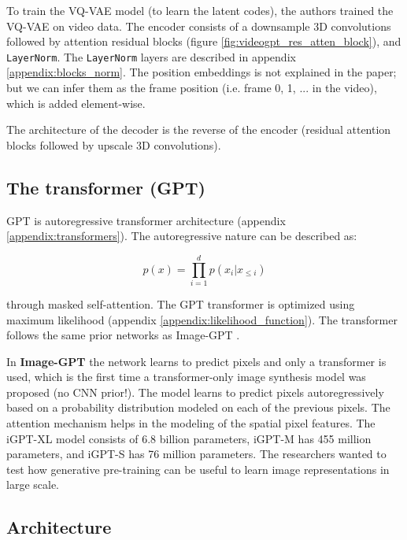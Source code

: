 To train the VQ-VAE model (to learn the latent codes), the authors trained the VQ-VAE on video data. The encoder consists of a downsample 3D convolutions followed by attention residual blocks (figure \ref{fig:videogpt_res_atten_block}), and \texttt{LayerNorm}. The \texttt{LayerNorm} layers are described in appendix \ref{appendix:blocks_norm}. The position embeddings is not explained in the paper; but we can infer them as the frame position (i.e. frame 0, 1, ... in the video), which is added element-wise.

The architecture of the decoder is the reverse of the encoder (residual attention blocks followed by upscale 3D convolutions).








\subsection*{The transformer (GPT)}

GPT is autoregressive transformer architecture (appendix \ref{appendix:transformers}). The autoregressive nature can be described as:

\[ p(x) = \prod_{i=1}^{d} p(x_i | x_{\leq i}) \] 

through masked self-attention. The GPT transformer is optimized using maximum likelihood (appendix \ref{appendix:likelihood_function}). The transformer follows the same prior networks as Image-GPT \cite{imagegpt}.

In \textbf{Image-GPT} the network learns to predict pixels and only a transformer is used, which is the first time a transformer-only image synthesis model was proposed (no CNN prior!). The model learns to predict pixels autoregressively based on a probability distribution modeled on each of the previous pixels. The attention mechanism helps in the modeling of the spatial pixel features. The iGPT-XL model consists of 6.8 billion parameters, iGPT-M has 455 million parameters, and iGPT-S has 76 million parameters. The researchers wanted to test how generative pre-training can be useful to learn image representations in large scale.










\subsection{Architecture}

